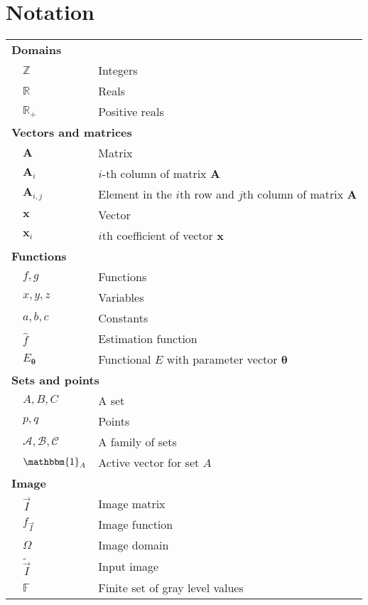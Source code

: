 \chapter*{Notation}
\label{chapternotation}

{
\setlength{\extrarowheight}{0.5em}
\begin{longtable}{p{0.5cm}ll}
\multicolumn{3}{l}{\textbf{Domains}}\\
& $\mathbb{Z}$ & Integers\\
& $\mathbb{R}$ & Reals\\
& $\mathbb{R}_+$ & Positive reals\\

\multicolumn{3}{l}{\textbf{Vectors and matrices}}\\
& $\mathbf{A}$ & Matrix\\
& $\mathbf{A}_i$ & $i$-th column of matrix $\mathbf{A}$\\
& $\mathbf{A}_{i,j}$ & Element in the $i$th row and $j$th column of matrix $\mathbf{A}$\\
& $\mathbf{x}$ & Vector\\
& $\mathbf{x}_i$ & $i$th coefficient of vector $\mathbf{x}$\\[1em]

\multicolumn{3}{l}{\textbf{Functions}}\\
& $f,g$ & Functions\\
& $x,y,z$ & Variables \\
& $a,b,c$ & Constants \\
& $\hat{f}$ & Estimation function\\
& $E_{\boldsymbol{\theta}}$ & Functional $E$  with parameter vector $\boldsymbol{\theta}$ \\[1em]

\multicolumn{3}{l}{\textbf{Sets and points}}\\
& $A,B,C$ & A set\\
& $p,q$ & Points\\
& $\mathcal{A},\mathcal{B},\mathcal{C}$ & A family of sets\\
& $\mathbbm{1}_A$ & Active vector for set $A$\\[1em]

\multicolumn{3}{l}{\textbf{Image}}\\
& $\vec{I}$ & Image matrix\\
& $f_{\vec{I}}$ & Image function\\
& $\Omega$ & Image domain\\
& $\widetilde{\vec{I}}$ & Input image\\
& $\mathbb{F}$ & Finite set of gray level values \\[1em]


\end{longtable}}
